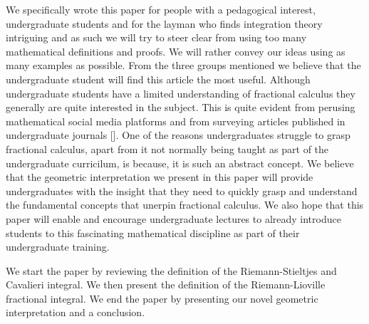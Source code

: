 \documentclass{article}
\theoremstyle{theorem}
\theoremstyle{definition}
\begin{document}
We specifically wrote this paper for people with a pedagogical interest, undergraduate students and for the layman who finds integration theory intriguing and 
as such we will try to steer clear from using too many mathematical definitions and proofs. We will rather convey our ideas using as many examples as possible. From the 
three groups mentioned we believe that the undergraduate student will find this article the most useful. Although undergraduate students have a limited understanding of 
fractional calculus they generally are quite interested in the subject. This is quite evident from perusing mathematical social media platforms and from surveying 
articles published in undergraduate journals []. One of the reasons undergraduates struggle to grasp fractional calculus, apart from it not normally being taught as part of the undergraduate curricilum, is because, 
it is such an abstract concept. We believe that the geometric interpretation we present in this paper will provide undergraduates with the insight that they need to quickly grasp and understand the fundamental 
concepts that unerpin fractional calculus. We also hope that this paper will enable and encourage undergraduate lectures to already introduce students to this fascinating mathematical discipline as part of their 
undergraduate training.   

We start the paper by reviewing the definition of the Riemann-Stieltjes and Cavalieri integral. We then present the definition of the Riemann-Lioville fractional integral. 
We end the paper by presenting our novel geometric interpretation and a conclusion.

\end{document}
